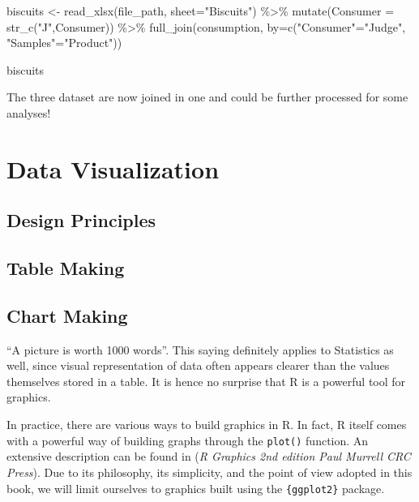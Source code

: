 \documentclass[
]{book}
\newenvironment{Shaded}{\begin{snugshade}}{\end{snugshade}}
\newcommand{\AttributeTok}[1]{\textcolor[rgb]{0.77,0.63,0.00}{#1}}
\newcommand{\FunctionTok}[1]{\textcolor[rgb]{0.00,0.00,0.00}{#1}}
\newcommand{\NormalTok}[1]{#1}
\newcommand{\OtherTok}[1]{\textcolor[rgb]{0.56,0.35,0.01}{#1}}
\newcommand{\SpecialCharTok}[1]{\textcolor[rgb]{0.00,0.00,0.00}{#1}}
\newcommand{\StringTok}[1]{\textcolor[rgb]{0.31,0.60,0.02}{#1}}
\begin{document}
\begin{Shaded}
\begin{Highlighting}[]
\NormalTok{biscuits }\OtherTok{\textless{}{-}} \FunctionTok{read\_xlsx}\NormalTok{(file\_path, }\AttributeTok{sheet=}\StringTok{"Biscuits"}\NormalTok{) }\SpecialCharTok{\%\textgreater{}\%} 
  \FunctionTok{mutate}\NormalTok{(}\AttributeTok{Consumer =} \FunctionTok{str\_c}\NormalTok{(}\StringTok{"J"}\NormalTok{,Consumer)) }\SpecialCharTok{\%\textgreater{}\%} 
  \FunctionTok{full\_join}\NormalTok{(consumption, }\AttributeTok{by=}\FunctionTok{c}\NormalTok{(}\StringTok{"Consumer"}\OtherTok{=}\StringTok{"Judge"}\NormalTok{, }\StringTok{"Samples"}\OtherTok{=}\StringTok{"Product"}\NormalTok{))}

\NormalTok{biscuits}
\end{Highlighting}
\end{Shaded}

The three dataset are now joined in one and could be further processed for some analyses!

\hypertarget{data-viz}{%
\chapter{Data Visualization}\label{data-viz}}

\hypertarget{design-principles}{%
\section{Design Principles}\label{design-principles}}

\hypertarget{table-making}{%
\section{Table Making}\label{table-making}}

\hypertarget{chart-making}{%
\section{Chart Making}\label{chart-making}}

``A picture is worth 1000 words''. This saying definitely applies to Statistics as well, since visual representation of data often appears clearer than the values themselves stored in a table. It is hence no surprise that R is a powerful tool for graphics.

In practice, there are various ways to build graphics in R. In fact, R itself comes with a powerful way of building graphs through the \texttt{plot()} function. An extensive description can be found in (\emph{R Graphics 2nd edition Paul Murrell CRC Press}). Due to its philosophy, its simplicity, and the point of view adopted in this book, we will limit ourselves to graphics built using the \texttt{\{ggplot2\}} package.
\end{document}
